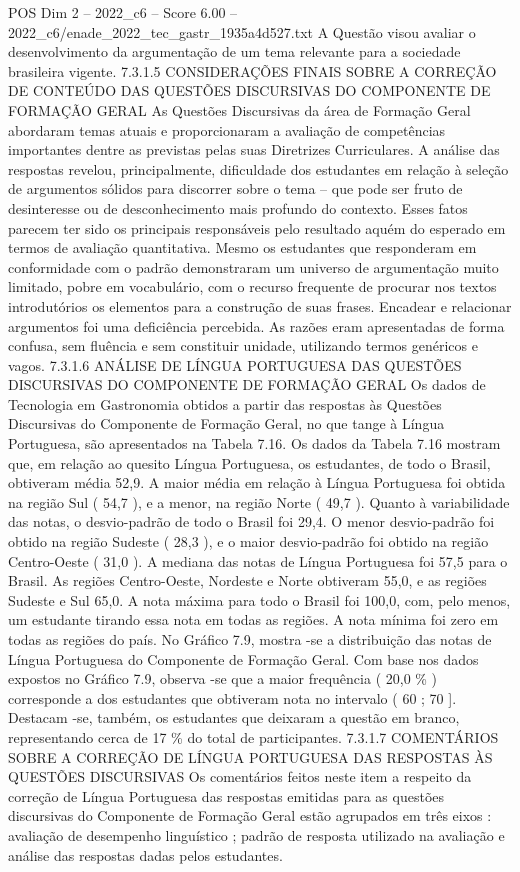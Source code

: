 \begin{textsample}{POS Dim 2 – 2022\_c6 – Score 6.00 – 2022\_c6/enade\_2022\_tec\_gastr\_1935a4d527.txt}
A Questão visou avaliar o desenvolvimento da argumentação de um tema relevante para a sociedade brasileira vigente. 7.3.1.5 CONSIDERAÇÕES FINAIS SOBRE A CORREÇÃO DE CONTEÚDO DAS QUESTÕES DISCURSIVAS DO COMPONENTE DE FORMAÇÃO GERAL As Questões Discursivas da área de Formação Geral abordaram temas atuais e proporcionaram a avaliação de competências importantes dentre as previstas pelas suas Diretrizes Curriculares.
A análise das respostas revelou, principalmente, dificuldade dos estudantes em relação à seleção de argumentos sólidos para discorrer sobre o tema – que pode ser fruto de desinteresse ou de desconhecimento mais profundo do contexto.
Esses fatos parecem ter sido os principais responsáveis pelo resultado aquém do esperado em termos de avaliação quantitativa.
Mesmo os estudantes que responderam em conformidade com o padrão demonstraram um universo de argumentação muito limitado, pobre em vocabulário, com o recurso frequente de procurar nos textos introdutórios os elementos para a construção de suas frases.
Encadear e relacionar argumentos foi uma deficiência percebida.
As razões eram apresentadas de forma confusa, sem fluência e sem constituir unidade, utilizando termos genéricos e vagos. 7.3.1.6 ANÁLISE DE LÍNGUA PORTUGUESA DAS QUESTÕES DISCURSIVAS DO COMPONENTE DE FORMAÇÃO GERAL Os dados de Tecnologia em Gastronomia obtidos a partir das respostas às Questões Discursivas do Componente de Formação Geral, no que tange à Língua Portuguesa, são apresentados na Tabela 7.16.
Os dados da Tabela 7.16 mostram que, em relação ao quesito Língua Portuguesa, os estudantes, de todo o Brasil, obtiveram média 52,9.
A maior média em relação à Língua Portuguesa foi obtida na região Sul ( 54,7 ), e a menor, na região Norte ( 49,7 ).
Quanto à variabilidade das notas, o desvio-padrão de todo o Brasil foi 29,4.
O menor desvio-padrão foi obtido na região Sudeste ( 28,3 ), e o maior desvio-padrão foi obtido na região Centro-Oeste ( 31,0 ).
A mediana das notas de Língua Portuguesa foi 57,5 para o Brasil.
As regiões Centro-Oeste, Nordeste e Norte obtiveram 55,0, e as regiões Sudeste e Sul 65,0.
A nota máxima para todo o Brasil foi 100,0, com, pelo menos, um estudante tirando essa nota em todas as regiões.
A nota mínima foi zero em todas as regiões do país.
No Gráfico 7.9, mostra -se a distribuição das notas de Língua Portuguesa do Componente de Formação Geral.
Com base nos dados expostos no Gráfico 7.9, observa -se que a maior frequência ( 20,0 \% ) corresponde a dos estudantes que obtiveram nota no intervalo ( 60 ; 70 ].
Destacam -se, também, os estudantes que deixaram a questão em branco, representando cerca de 17 \% do total de participantes. 7.3.1.7 COMENTÁRIOS SOBRE A CORREÇÃO DE LÍNGUA PORTUGUESA DAS RESPOSTAS ÀS QUESTÕES DISCURSIVAS Os comentários feitos neste item a respeito da correção de Língua Portuguesa das respostas emitidas para as questões discursivas do Componente de Formação Geral estão agrupados em três eixos : avaliação de desempenho linguístico ; padrão de resposta utilizado na avaliação e análise das respostas dadas pelos estudantes.

\end{textsample}
